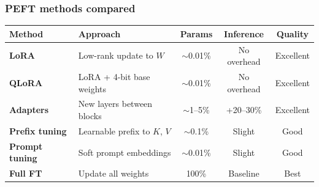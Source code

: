 \documentclass[aspectratio=169]{beamer}
\begin{document}
\begin{frame}
\frametitle{PEFT methods compared}

\vspace{-0.1cm}
\renewcommand{\arraystretch}{1.4}
\begin{center}
{\small
\begin{tabular}{>{\bfseries}l l c c c}
  \textbf{Method} & \textbf{Approach} & \textbf{Params} & \textbf{Inference} & \textbf{Quality} \\
  \hline
  \textcolor{paramgreen}{LoRA} & Low-rank update to $W$ & $\sim$0.01\% & No overhead & Excellent \\[2pt]
  \textcolor{paramgreen}{QLoRA} & LoRA + 4-bit base weights & $\sim$0.01\% & No overhead & Excellent \\[2pt]
  \textcolor{popblue}{Adapters} & New layers between blocks & $\sim$1--5\% & +20--30\% & Excellent \\[2pt]
  \textcolor{orange1}{Prefix tuning} & Learnable prefix to $K$, $V$ & $\sim$0.1\% & Slight & Good \\[2pt]
  \textcolor{violet1}{Prompt tuning} & Soft prompt embeddings & $\sim$0.01\% & Slight & Good \\[2pt]
  \textcolor{sampred}{Full FT} & Update all weights & 100\% & Baseline & Best \\
  \hline
\end{tabular}
}
\end{center}

\vspace{0.3cm}
\begin{center}
\end{center}
\end{frame}
\end{document}
